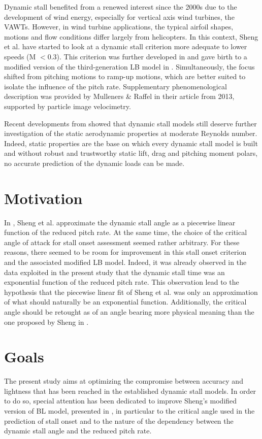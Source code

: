 Dynamic stall  benefited from a renewed interest since the 2000s due to the development of wind energy, especially for vertical axis wind turbines, the VAWTs. However, in wind turbine applications, the typical airfoil shapes, motions and flow conditions differ largely from helicopters. In this context, Sheng et al. have started to look at a dynamic stall criterion more adequate to lower speeds (M $<0.3$). This criterion was further developed in \cite{sheng_improved_2007} and gave birth to a modified version of the third-generation LB model in \cite{sheng_modified_2008}. Simultaneously, the focus shifted from pitching motions to ramp-up motions, which are better suited to isolate the influence of the pitch rate. Supplementary phenomenological description was provided by Mulleners \& Raffel in their article \cite{mulleners_dynamic_2013} from 2013, supported by particle image velocimetry. 

Recent developments from \cite{tank_possibility_2017} showed that dynamic stall models still deserve further investigation of the static aerodynamic properties at moderate Reynolds number. Indeed, static properties are the base on which every dynamic stall model is built and without robust and trustworthy static lift, drag and pitching moment polars, no accurate prediction of the dynamic loads can be made. 

\section{Motivation}

In \cite{sheng_improved_2007}, Sheng et al. approximate the dynamic stall angle as a piecewise linear function of the reduced pitch rate. At the same time, the choice of the critical angle of attack for stall onset assessment seemed rather arbitrary. For these reasons, there seemed to be room for improvement in this stall onset criterion and the associated modified LB model. 
Indeed, it was already observed in the data exploited in the present study that the dynamic stall time was an exponential function of the reduced pitch rate. This observation lead to the hypothesis that the piecewise linear fit of Sheng et al. was only an approximation of what should naturally be an exponential function. Additionally, the critical angle should be retought as of an angle bearing more physical meaning than the one proposed by Sheng in \cite{sheng_modified_2008}.

\section{Goals}

The present study aims at optimizing the compromise between accuracy and lightness that has been reached in the established dynamic stall models. In order to do so, special attention has been dedicated to improve Sheng's modified version of BL model, presented in \cite{sheng_modified_2008}, in particular to the critical angle used in the prediction of stall onset and to the nature of the dependency between the dynamic stall angle and the reduced pitch rate.